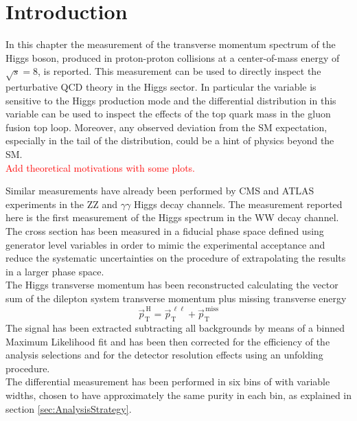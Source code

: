 \section{Introduction}
\label{sec:Introduction}

In this chapter the measurement of the transverse momentum spectrum of the Higgs boson, produced in proton-proton collisions at a center-of-mass energy of $\sqrt{s}=8$\TeV, is reported.
This measurement can be used to directly inspect the perturbative QCD theory in the Higgs sector.
In particular the \pth variable is sensitive to the Higgs production mode and the differential distribution in this variable can be used to inspect the effects of the top quark mass in the gluon fusion top loop. Moreover, any observed deviation from the SM expectation, especially in the tail of the \pth distribution, could be a hint of physics beyond the SM.\\
\textcolor{red}{Add theoretical motivations with some plots.}

Similar measurements have already been performed by CMS and ATLAS experiments in the ZZ and $\gamma\gamma$ Higgs decay channels.
The measurement reported here is the first measurement of the Higgs \pt spectrum in the WW decay channel.\\
The cross section has been measured in a fiducial phase space defined using generator level variables in order to mimic the experimental acceptance and reduce the systematic uncertainties on the procedure of extrapolating the results in a larger phase space.\\
The Higgs transverse momentum has been reconstructed calculating the vector sum of the dilepton system transverse momentum plus missing transverse energy 
\begin{equation}
\vec{p}_\mathrm{T}^\mathrm{\,H} = \vec{p}_\mathrm{T}^{\,\ell\ell} + \vec{p}_\mathrm{T}^\mathrm{\,miss}
\end{equation}
The signal has been extracted subtracting all backgrounds by means of a binned Maximum Likelihood fit and has been then corrected for the efficiency of the analysis selections and for the detector resolution effects using an unfolding procedure.\\
The differential measurement has been performed in six bins of \pth with variable widths, chosen to have approximately the same purity in each bin, as explained in section \ref{sec:AnalysisStrategy}.\\




